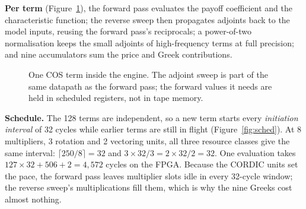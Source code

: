 \documentclass[11pt,a4paper]{article}
\begin{document}
\textbf{Per term} (Figure~\ref{fig:term}), the forward pass evaluates the payoff
coefficient and the characteristic function; the reverse sweep then propagates
adjoints back to the model inputs, reusing the forward pass's reciprocals; a
power-of-two normalisation keeps the small adjoints of high-frequency terms at full
precision; and nine accumulators sum the price and Greek contributions.

\begin{figure}[H]
\centering
{}
\caption{One COS term inside the engine. The adjoint sweep is part of the same
datapath as the forward pass; the forward values it needs are held in scheduled registers, not in tape memory.}
\label{fig:term}
\end{figure}

\textbf{Schedule.} The 128 terms are independent, so a new term starts every
\emph{initiation interval} of 32 cycles while earlier terms are still in flight
(Figure~\ref{fig:sched}). At 8 multipliers, 3 rotation and 2 vectoring units, all
three resource classes give the same interval:
$\lceil 250/8 \rceil = 32$ and $3\times32/3 = 2\times32/2 = 32$. One evaluation takes
$127\times32 + 506 + 2 = 4{,}572$ cycles on the FPGA. Because the CORDIC units set the
pace, the forward pass leaves multiplier slots idle in every 32-cycle window; the
reverse sweep's multiplications fill them, which is why the nine Greeks cost almost
nothing.
\end{document}
